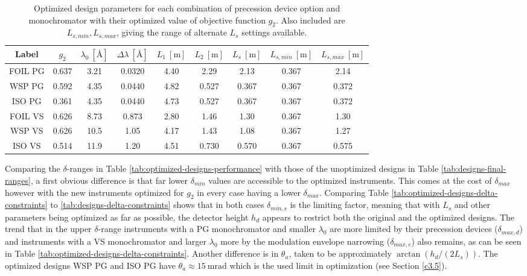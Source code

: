 \begin{table}[h!]
	\centering
	\begin{tabular}{c | c | c c c c c | c c}
		\toprule
		Label & $g_2$ & $\lambda_0 ~[\unit{\angstrom}]$ & $\Delta\lambda ~[\unit{\angstrom}]$ & $L_1 ~[\unit{\meter}]$ & $L_2 ~[\unit{\meter}]$ & $L_s  ~[\unit{\meter}]$ & $L_{s,min}  ~[\unit{\meter}]$& $L_{s, max}  ~[\unit{\meter}]$\\
		\midrule
		FOIL PG & \num{0.637} & \num{3.21} & \num{0.0320} & \num{4.40} & \num{2.29} & \num{2.13} & \num{0.367} & \num{2.14} \\
		WSP PG & \num{0.592} & \num{4.35} & \num{0.0440} & \num{4.82} & \num{0.527} & \num{0.367} & \num{0.367} & \num{0.372} \\
		ISO PG & \num{0.361} & \num{4.35} & \num{0.0440} & \num{4.73} & \num{0.527} & \num{0.367} & \num{0.367} & \num{0.372} \\
		FOIL VS & \num{0.626} & \num{8.73} & \num{0.873} & \num{2.80} & \num{1.46} & \num{1.30} & \num{0.367} & \num{1.30} \\
		WSP VS & \num{0.626} & \num{10.5} & \num{1.05} & \num{4.17} & \num{1.43} & \num{1.08} & \num{0.367} & \num{1.27} \\
		ISO VS & \num{0.514} & \num{11.9} & \num{1.20} & \num{4.51} & \num{0.730} & \num{0.570} & \num{0.367} & \num{0.575} \\
		\bottomrule
	\end{tabular}
	\caption{Optimized design parameters for each combination of precession device option and monochromator with their optimized value of objective function $g_2$. Also included are $L_{s,min}, L_{s,max}$, giving the range of alternate $L_s$ settings available.}
	\label{tab:optimized-designs}
\end{table}
Comparing the $\delta$-ranges in Table \ref{tab:optimized-designs-performance} with those of the unoptimized designs in Table \ref{tab:designs-final-ranges}, a first obvious difference is that far lower $\delta_{min}$ values are accessible to the optimized instruments. This comes at the cost of $\delta_{max}$ however with the new instruments optimized for $g_2$ in every case having a lower $\delta_{max}$. Comparing Table \ref{tab:optimized-designs-delta-constraints} to \ref{tab:designs-delta-constraints} shows that in both cases $\delta_{min,s}$ is the limiting factor, meaning that with $L_s$ and other parameters being optimized as far as possible, the detector height $h_d$ appears to restrict both the original and the optimized designs. The trend that in the upper $\delta$-range instruments with a PG monochromator and smaller $\lambda_0$ are more limited by their precession devices ($\delta_{max,d}$) and instruments with a VS monochromator and larger $\lambda_0$ more by the modulation envelope narrowing ($\delta_{max,e}$) also remains, as can be seen in Table \ref{tab:optimized-designs-delta-constraints}. Another difference is in $\theta_a$, taken to be approximately $\arctan(h_d/(2L_s))$. The optimized designs WSP PG and ISO PG have $\theta_a \approx \SI{15}{\milli\radian}$ which is the used limit in optimization (see Section \ref{c3.5}).

